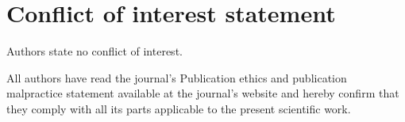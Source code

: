 \documentclass{jib}
\begin{document}
\section*{Conflict of interest statement}

Authors state no conflict of interest.

All authors have read the journal's Publication ethics and publication malpractice statement available at the journal's website and hereby confirm that they comply
with all its parts applicable to the present scientific work.


%
%


\nocite{*}
\end{document}
